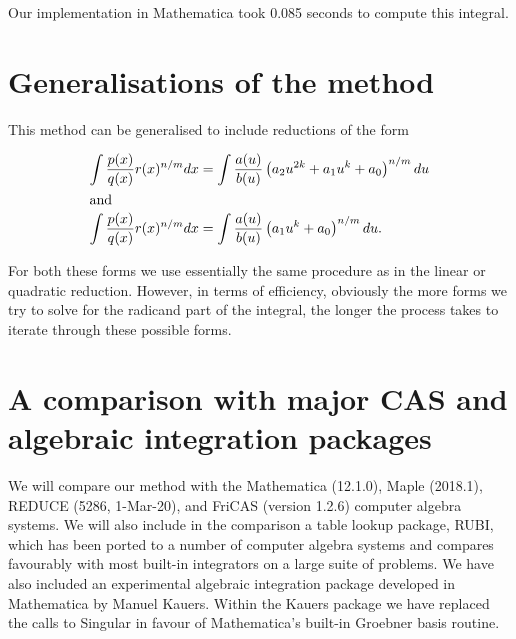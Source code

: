 \documentclass[12pt]{article}
\numberwithin{equation}{section}
\def\todo#1{\textcolor{red}{\textbf{**** TODO -- #1 ****}}}
\theoremstyle{definition}
\newtheorem{example}{Example}[section]
\begin{document}
Our implementation in Mathematica took 0.085 seconds to compute this integral.  

\iffalse
\begin{example}
In our final example we consider the particularly elegant integral 
$$\int\frac{\left(x^2-1\right)\sqrt{x^4+x^2+1}}{\left(x^2+1\right)\left(x^4+x^3+x^2+x+1\right)} \, dx.$$

\todo{Finish this example.}

\end{example}
\fi

\section{Generalisations of the method}

This method can be generalised to include reductions of the form  

\begin{align*}
\int \frac{p(x)}{q(x)}r(x)^{n/m}dx &= \int \frac{a(u)}{b(u)}\left(a_2u^{2k}+a_1u^k+a_0\right)^{n/m}du\\
\intertext{and}
\int \frac{p(x)}{q(x)}r(x)^{n/m}dx &= \int \frac{a(u)}{b(u)}\left(a_1u^k+a_0\right)^{n/m}du.\\
\end{align*}

For both these forms we use essentially the same procedure as in the linear or quadratic 
reduction. However, in terms of efficiency, obviously the more forms we try to solve for 
the radicand part of the integral, the longer the process takes to iterate through these 
possible forms. 

\section{A comparison with major CAS and algebraic integration packages}

We will compare our method with the Mathematica (12.1.0), Maple (2018.1), REDUCE (5286, 1-Mar-20), 
and FriCAS (version 1.2.6) computer algebra systems. We will also include in the comparison a table 
lookup package, RUBI\cite{Rich2018}, which has been ported to a number of computer algebra systems 
and compares favourably with most built-in integrators on a large suite of problems\cite{rubi_results}. 
We have also included an experimental algebraic integration package developed in Mathematica by Manuel 
Kauers\cite{Kauers2008}. Within the Kauers package we have replaced the calls to Singular in favour
of Mathematica's built-in Groebner basis routine.\\
\end{document}
